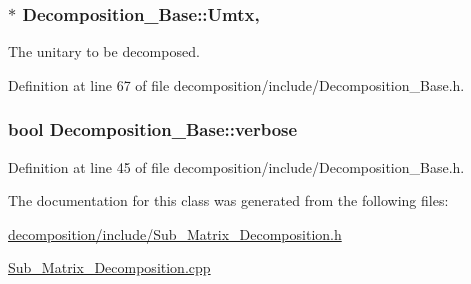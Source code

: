 \subsubsection[{\texorpdfstring{Umtx}{Umtx}}]{ $\ast$ Decomposition\+\_\+\+Base\+::\+Umtx\hspace{0.3cm}{\ttfamily [protected]}, {\ttfamily [inherited]}}\hypertarget{class_decomposition___base_a61a784aaba39276260b3f73709b51ccc}{}\label{class_decomposition___base_a61a784aaba39276260b3f73709b51ccc}


The unitary to be decomposed. 



Definition at line 67 of file decomposition/include/\+Decomposition\+\_\+\+Base.\+h.

\subsubsection[{\texorpdfstring{verbose}{verbose}}]{\setlength{\rightskip}{0pt plus 5cm}bool Decomposition\+\_\+\+Base\+::verbose\hspace{0.3cm}{\ttfamily [inherited]}}\hypertarget{class_decomposition___base_a0636a9e49a19f7167b7abdf309882042}{}\label{class_decomposition___base_a0636a9e49a19f7167b7abdf309882042}


Definition at line 45 of file decomposition/include/\+Decomposition\+\_\+\+Base.\+h.



The documentation for this class was generated from the following files\+:\begin{DoxyCompactItemize}
\item 
\hyperlink{decomposition_2include_2_sub___matrix___decomposition_8h}{decomposition/include/\+Sub\+\_\+\+Matrix\+\_\+\+Decomposition.\+h}\item 
\hyperlink{_sub___matrix___decomposition_8cpp}{Sub\+\_\+\+Matrix\+\_\+\+Decomposition.\+cpp}\end{DoxyCompactItemize}
